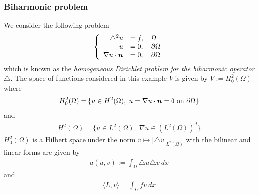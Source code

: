 \subsubsection*{Biharmonic problem}
We consider the following problem
\begin{align}
  \left\{ 
  \begin{array}{rl}
    \triangle^2 u &= f, \quad \Omega 
    \\
    u &= 0, \quad \partial\Omega
    \\
    \nabla u \cdot \bm{n} &= 0, \quad \partial\Omega
  \end{array} \right.
  \label{eq:biharmonic_pde}
\end{align}
which is known as the \textit{homogeneous Dirichlet problem for the biharmonic operator $\triangle$}.
The space of functions considered in this example $V$ is given by $V := H^2_0(\Omega)$ where
\begin{align}
  H^2_0(\Omega) = \{ u\in H^2(\Omega) , \;   u=\nabla u \cdot \bm{n}=0 \mbox{ on } \partial \Omega \}
  \label{eq:h2_0_space}
\end{align}
and
\begin{align} %
  H^2(\Omega) = \{ u\in L^2(\Omega), \;  \nabla u\in (L^2(\Omega))^d \}
  \label{eq:h2_space}
\end{align}
$H^2_0(\Omega)$ is a Hilbert space under the norm $v \mapsto | \triangle v |_{L^2(\Omega)}$ with
the bilinear and linear forms are given by
\begin{align*}
  a(u,v) := \int_{\Omega} \triangle u \triangle v ~ dx 
\end{align*}
and
\begin{align*}
  \langle L, v \rangle = \int_{\Omega} f v ~ dx
\end{align*}

